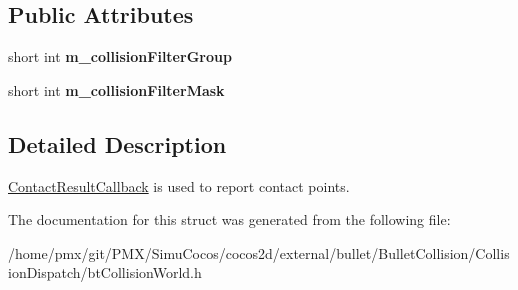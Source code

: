 \subsection*{Public Attributes}
\begin{DoxyCompactItemize}
\item 
\mbox{\label{structbtCollisionWorld_1_1ContactResultCallback_a6b7ee2d7d580191bf4de238f4cadc639}} 
short int {\bfseries m\+\_\+collision\+Filter\+Group}
\item 
\mbox{\label{structbtCollisionWorld_1_1ContactResultCallback_a36e0dd3638b9fdbbd1818869823df192}} 
short int {\bfseries m\+\_\+collision\+Filter\+Mask}
\end{DoxyCompactItemize}


\subsection{Detailed Description}
\hyperlink{structbtCollisionWorld_1_1ContactResultCallback}{Contact\+Result\+Callback} is used to report contact points. 

The documentation for this struct was generated from the following file\+:\begin{DoxyCompactItemize}
\item 
/home/pmx/git/\+P\+M\+X/\+Simu\+Cocos/cocos2d/external/bullet/\+Bullet\+Collision/\+Collision\+Dispatch/bt\+Collision\+World.\+h\end{DoxyCompactItemize}
